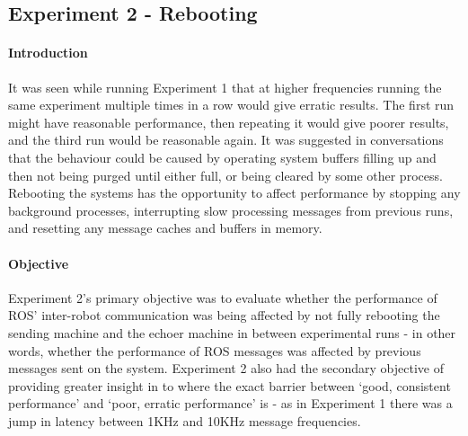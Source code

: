 \documentclass[../dissertation.tex]{subfiles}
\begin{document}
\subsection{Experiment 2 - Rebooting}

\paragraph{Introduction} It was seen while running Experiment 1 that at higher frequencies running the same experiment multiple times in a row would give erratic results. The first run might have reasonable performance, then repeating it would give poorer results, and the third run would be reasonable again. It was suggested in conversations that the behaviour could be caused by operating system buffers filling up and then not being purged until either full, or being cleared by some other process. Rebooting the systems has the opportunity to affect performance by stopping any background processes, interrupting slow processing messages from previous runs, and resetting any message caches and buffers in memory.


\paragraph{Objective} Experiment 2's primary objective was to evaluate whether the performance of ROS' inter-robot communication was being affected by not fully rebooting the sending machine and the echoer machine in between experimental runs - in other words, whether the performance of ROS messages was affected by previous messages sent on the system. Experiment 2 also had the secondary objective of providing greater insight in to where the exact barrier between `good, consistent performance' and `poor, erratic performance' is - as in Experiment 1 there was a jump in latency between 1KHz and 10KHz message frequencies.
\end{document}

